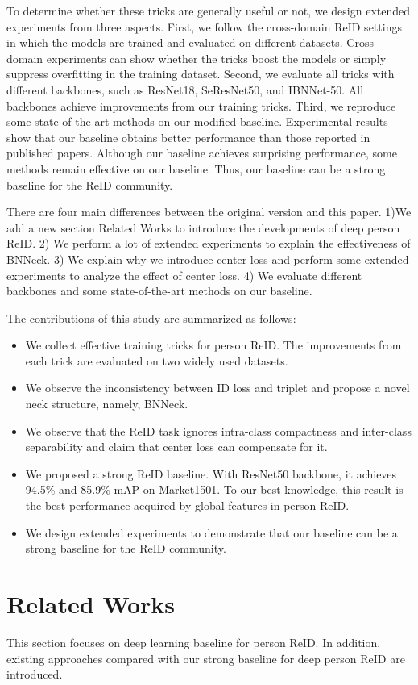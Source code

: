 \documentclass[journal]{IEEEtran}
\begin{document}
To determine whether these tricks are generally useful or not, we design extended experiments from three aspects.
First, we follow the cross-domain ReID settings in which the models are trained and evaluated on different datasets.
Cross-domain experiments can show whether the tricks boost the models or simply suppress overfitting in the training dataset.
Second, we evaluate all tricks with different backbones, such as ResNet18, SeResNet50, and IBNNet-50.
All backbones achieve improvements from our training tricks.
Third, we reproduce some state-of-the-art methods on our modified baseline.
Experimental results show that our baseline obtains better performance than those reported in published papers.
Although our baseline achieves surprising performance, some methods remain effective on our baseline.
Thus, our baseline can be a strong baseline for the ReID community.

There are four main differences between the original version and this paper. 1)We add a new section Related Works to introduce the developments of deep person ReID.
2) We perform a lot of extended experiments to explain the effectiveness of BNNeck.
3) We explain why we introduce center loss and perform some extended experiments to analyze the effect of center loss.
4) We evaluate different backbones and some state-of-the-art methods on our baseline.

The contributions of this study are summarized as follows:
\begin{itemize}
  \item We collect effective training tricks for person ReID. The improvements from each trick are evaluated on two widely used datasets.
  \item We observe the inconsistency between ID loss and triplet and propose a novel neck structure, namely, BNNeck.
  \item We observe that the ReID task ignores intra-class compactness and inter-class separability and claim that center loss can compensate for it.
  \item We proposed a strong ReID baseline. With ResNet50 backbone, it achieves 94.5\% and 85.9\% mAP on Market1501. To our best knowledge, this result is the best performance acquired by global features in person ReID.
  \item We design extended experiments to demonstrate that our baseline can be a strong baseline for the ReID community.
\end{itemize}

\section{Related Works}
This section focuses on deep learning baseline for person ReID. In addition, existing approaches compared with our strong baseline for deep person ReID are introduced.
\end{document}
